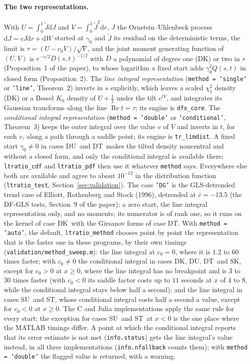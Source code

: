 \documentclass[11pt]{article}
\newcommand{\code}[1]{\texttt{#1}}
\newcommand{\dr}[1]{{\mathrm d}#1}
\newcommand{\Rea}{\operatorname{Re}}
\newcommand{\Fk}{\textsf{DK}}
\newcommand{\Fu}{\textsf{DU}}
\newcommand{\Ft}{\textsf{DT}}
\newcommand{\Sk}{\textsf{SK}}
\newcommand{\Su}{\textsf{SU}}
\newcommand{\St}{\textsf{ST}}
\begin{document}
\paragraph{The two representations.}  With $U=\int_0^1\tilde J\dr J$ and $V=\int_0^1\tilde J^2\dr r$, $J$ the Ornstein--Uhlenbeck process $\dr J=cJ\dr r+\dr W$ started at $\gamma_0$ and $\tilde J$ its residual on the deterministic terms, the limit is $\tau=(U-c_0V)/\sqrt V$, and the joint moment generating function of $(U,V)$ is $e^{-s/2}D(s,t)^{-1/2}$ with $D$ a polynomial of degree one (\Fk) or two in $s$ (Proposition~1 of the paper), to whose logarithm a fixed start adds $\gamma_0^2Q(s,t)$ in closed form (Proposition~2).  The \emph{line integral representation} (\code{method = 'single'} or \code{'line'}, Theorem~2) inverts in $s$ explicitly, which leaves a scaled $\chi^2_1$ density (\Fk) or a Bessel $K_0$ density of $U+\frac12$ under the tilt $e^{tV}$, and integrates its Gaussian transforms along the line $\Rea t=\tau$; its engine is \code{dfx\_core}.  The \emph{conditional integral representation} (\code{method = 'double'} or \code{'conditional'}, Theorem~3) keeps the outer integral over the value $v$ of $V$ and inverts in $t$, for each $v$, along a path through a saddle point; its engine is \code{tr\_limdist}.  A fixed start $\gamma_0\ne0$ in cases \Fu\ and \Ft\ makes the tilted density noncentral and without a closed form, and only the conditional integral is available there; \code{ltratio\_cdf} and \code{ltratio\_pdf} then use it whatever \code{method} says.  Everywhere else both are available and agree to about $10^{-12}$ in the distribution function (\code{ltratio\_test}, Section~\ref{sec:validation}).  The case \code{'DG'} is the GLS-detrended trend case of Elliott, Rothenberg and Stock (1996), detrended at $\bar c=-13.5$ (the DF-GLS tests, Section~9 of the paper): a zero start, the line integral representation only, and no moments; its numerator is of rank one, so it runs on the kernel of case \Fk\ with the Girsanov forms of case \Ft.  With \code{method = 'auto'}, the default, \code{ltratio\_method} chooses point by point the representation that is the faster one in these programs, by their own timings (\code{validation/method\_sweep.m}): the line integral at $c_0=0$, where it is $1.2$ to $60$ times faster; with $c_0\ne0$ the conditional integral in cases \Fk, \Fu, \Ft\ and \Sk, except for $c_0>0$ at $x\ge0$, where the line integral has no breakpoint and is $3$ to $30$ times faster (with $c_0<0$ its saddle factor costs up to $11$ seconds at $x$ of $4$ to $8$, while the conditional integral stays below half a second); and the line integral in cases \Su\ and \St, whose conditional integral costs half a second a value, except for $c_0<0$ at $x\ge0$.  The C and Julia implementations apply the same rule for every start; the exception for cases \Su\ and \St\ at $x<0$ is the one place where the MATLAB timings differ.  A point at which the conditional integral reports that its error estimate is not met (\code{info.status}) gets the line integral's value instead, in all three implementations (\code{info.nfallback} counts them); with \code{method = 'double'} the flagged value is returned, with a warning.
\end{document}
